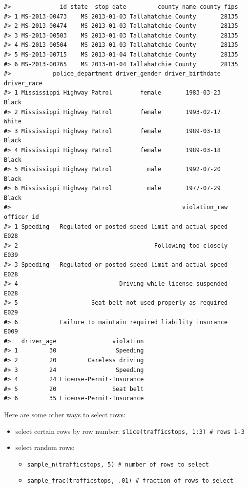 \documentclass[]{book}
\providecommand{\tightlist}{%
  \setlength{\itemsep}{0pt}\setlength{\parskip}{0pt}}
\theoremstyle{definition}
\theoremstyle{definition}
\theoremstyle{definition}
\theoremstyle{remark}
\begin{document}
\begin{verbatim}
#>              id state  stop_date         county_name county_fips
#> 1 MS-2013-00473    MS 2013-01-03 Tallahatchie County       28135
#> 2 MS-2013-00474    MS 2013-01-03 Tallahatchie County       28135
#> 3 MS-2013-00503    MS 2013-01-03 Tallahatchie County       28135
#> 4 MS-2013-00504    MS 2013-01-03 Tallahatchie County       28135
#> 5 MS-2013-00715    MS 2013-01-04 Tallahatchie County       28135
#> 6 MS-2013-00765    MS 2013-01-04 Tallahatchie County       28135
#>            police_department driver_gender driver_birthdate driver_race
#> 1 Mississippi Highway Patrol        female       1983-03-23       Black
#> 2 Mississippi Highway Patrol        female       1993-02-17       White
#> 3 Mississippi Highway Patrol        female       1989-03-18       Black
#> 4 Mississippi Highway Patrol        female       1989-03-18       Black
#> 5 Mississippi Highway Patrol          male       1992-07-20       Black
#> 6 Mississippi Highway Patrol          male       1977-07-29       Black
#>                                                 violation_raw officer_id
#> 1 Speeding - Regulated or posted speed limit and actual speed       E028
#> 2                                       Following too closely       E039
#> 3 Speeding - Regulated or posted speed limit and actual speed       E028
#> 4                             Driving while license suspended       E028
#> 5                     Seat belt not used properly as required       E029
#> 6            Failure to maintain required liability insurance       E009
#>   driver_age                violation
#> 1         30                 Speeding
#> 2         20         Careless driving
#> 3         24                 Speeding
#> 4         24 License-Permit-Insurance
#> 5         20                Seat belt
#> 6         35 License-Permit-Insurance
\end{verbatim}

Here are some other ways to select rows:

\begin{itemize}
\tightlist
\item
  select certain rows by row number:
  \texttt{slice(trafficstops,\ 1:3)\ \#\ rows\ 1-3}
\item
  select random rows:

  \begin{itemize}
  \tightlist
  \item
    \texttt{sample\_n(trafficstops,\ 5)\ \#\ number\ of\ rows\ to\ select}
  \item
    \texttt{sample\_frac(trafficstops,\ .01)\ \#\ fraction\ of\ rows\ to\ select}
  \end{itemize}
\end{itemize}
\end{document}
